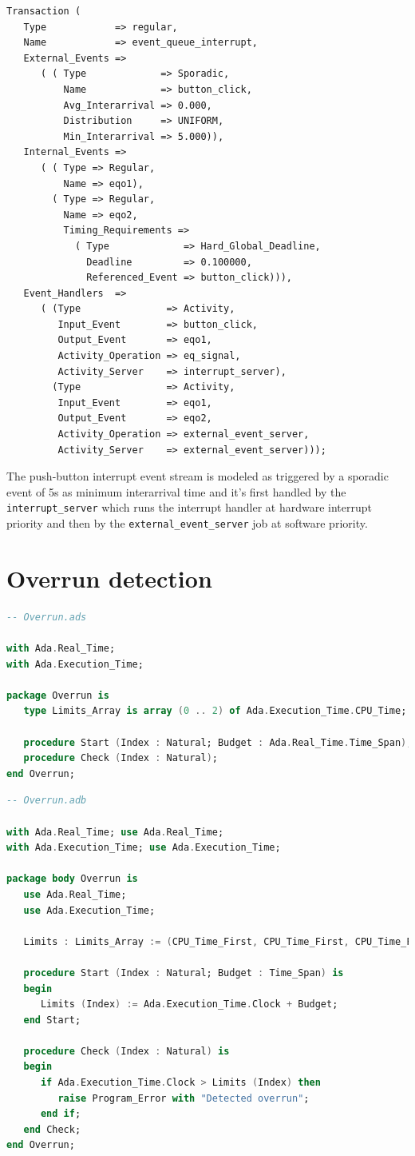 \documentclass{article}
\begin{document}
\begin{lstlisting}
Transaction (
   Type            => regular,
   Name            => event_queue_interrupt,
   External_Events =>
      ( ( Type             => Sporadic,
          Name             => button_click,
          Avg_Interarrival => 0.000,
          Distribution     => UNIFORM,
          Min_Interarrival => 5.000)),
   Internal_Events =>
      ( ( Type => Regular,
          Name => eqo1),
        ( Type => Regular,
          Name => eqo2,
          Timing_Requirements =>
            ( Type             => Hard_Global_Deadline,
              Deadline         => 0.100000,
              Referenced_Event => button_click))),
   Event_Handlers  =>
      ( (Type               => Activity,
         Input_Event        => button_click,
         Output_Event       => eqo1,
         Activity_Operation => eq_signal,
         Activity_Server    => interrupt_server),
        (Type               => Activity,
         Input_Event        => eqo1,
         Output_Event       => eqo2,
         Activity_Operation => external_event_server,
         Activity_Server    => external_event_server)));
\end{lstlisting}

The push-button interrupt event stream is modeled as triggered by a sporadic event of 5s as minimum interarrival time and it's first handled by the \texttt{interrupt\_server} which runs the interrupt handler at hardware interrupt priority and then by the \texttt{external\_event\_server} job at software priority.

\section{Overrun detection}

\begin{lstlisting}[language=Ada]
-- Overrun.ads

with Ada.Real_Time;
with Ada.Execution_Time;

package Overrun is
   type Limits_Array is array (0 .. 2) of Ada.Execution_Time.CPU_Time;

   procedure Start (Index : Natural; Budget : Ada.Real_Time.Time_Span);
   procedure Check (Index : Natural);
end Overrun;
\end{lstlisting}

\begin{lstlisting}[language=Ada]
-- Overrun.adb

with Ada.Real_Time; use Ada.Real_Time;
with Ada.Execution_Time; use Ada.Execution_Time;

package body Overrun is
   use Ada.Real_Time;
   use Ada.Execution_Time;

   Limits : Limits_Array := (CPU_Time_First, CPU_Time_First, CPU_Time_First);

   procedure Start (Index : Natural; Budget : Time_Span) is
   begin
      Limits (Index) := Ada.Execution_Time.Clock + Budget;
   end Start;

   procedure Check (Index : Natural) is
   begin
      if Ada.Execution_Time.Clock > Limits (Index) then
         raise Program_Error with "Detected overrun";
      end if;
   end Check;
end Overrun;
\end{lstlisting}
\end{document}
